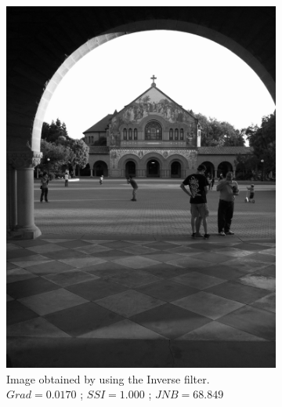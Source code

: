 \begin{figure}[H]
        \centering
        \begin{subfigure}[b]{0.35\textwidth}
                \centering
                \includegraphics[width=\textwidth]{memchu_inv.jpg}
                \caption{Image obtained by using the Inverse filter.\newline $Grad=0.0170$ ; $SSI=1.000$ ; $JNB=68.849$}
        \end{subfigure}
        \hspace{1.5cm}
        \begin{subfigure}[b]{0.35\textwidth}
                 \centering

\end{subfigure}
\end{figure}
